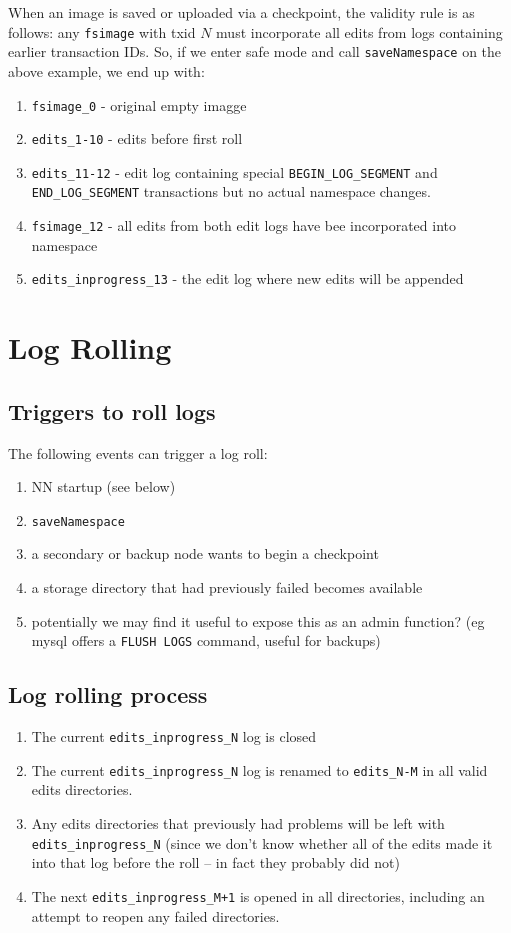 \documentclass{article}
\begin{document}
When an image is saved or uploaded via a checkpoint, the validity rule is as follows:
any {\tt fsimage} with txid $N$ must incorporate all edits from logs containing earlier transaction IDs.
So, if we enter safe mode and call {\tt saveNamespace} on the above example, we end up with:
\begin{enumerate}
\item  {\tt fsimage\_0} - original empty imagge
\item  {\tt edits\_1-10} - edits before first roll
\item  {\tt edits\_11-12} - edit log containing special {\tt BEGIN\_LOG\_SEGMENT} and {\tt END\_LOG\_SEGMENT} transactions but no actual namespace changes.
\item  {\tt fsimage\_12} - all edits from both edit logs have bee incorporated into namespace
\item  {\tt edits\_inprogress\_13} - the edit log where new edits will be appended
\end{enumerate}

\section{Log Rolling}

\subsection{Triggers to roll logs}
The following events can trigger a log roll:

\begin{enumerate}
\item NN startup (see below)
\item {\tt saveNamespace}
\item a secondary or backup node wants to begin a checkpoint
\item a storage directory that had previously failed becomes available
\item potentially we may find it useful to expose this as an admin function? (eg mysql offers a {\tt FLUSH LOGS} command, useful for backups)
\end{enumerate}

\subsection{Log rolling process}

\begin{enumerate}
\item The current {\tt edits\_inprogress\_N} log is closed
\item The current {\tt edits\_inprogress\_N} log is renamed to {\tt edits\_N-M} in all valid edits directories.
\item Any edits directories that previously had problems will be left with {\tt edits\_inprogress\_N} (since we don't know whether all of the edits made it into that log before the roll -- in fact they probably did not)
\item The next {\tt edits\_inprogress\_M+1} is opened in all directories, including an attempt to reopen any failed directories.
\end{enumerate}
\end{document}
